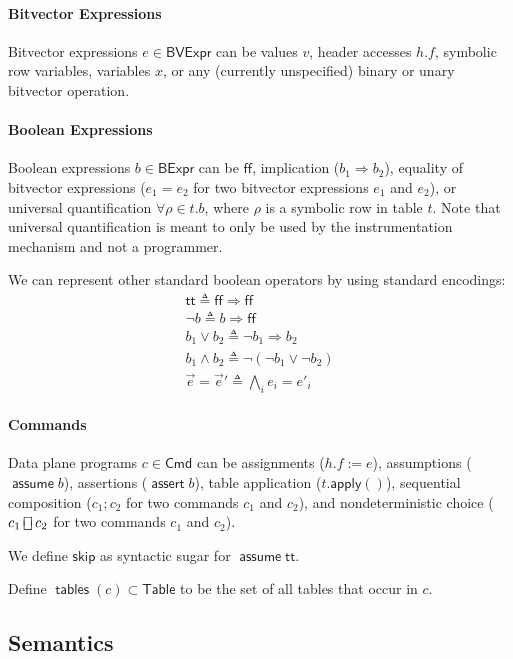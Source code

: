 \documentclass{article}
\newcommand{\TRUE}{\mathsf{tt}}
\newcommand{\FALSE}{\mathsf{ff}}
\newcommand{\BVExpr}{\mathsf{BVExpr}}
\newcommand{\BExpr}{\mathsf{BExpr}}
\newcommand{\Table}{\mathsf{Table}}
\newcommand{\assert}{\mathop{\mathsf{assert}}}
\newcommand{\assume}{\mathop{\mathsf{assume}}}
\newcommand{\apply}{\mathsf{apply}}
\newcommand{\choiceop}{\rotatebox[origin=c]{90}{$\sqsubset\!\!\!\sqsupset$}}
\newcommand{\choice}{\mathbin{\choiceop}}
\newcommand{\SKIP}{\mathsf{skip}}
\newcommand{\tables}{\mathop{\mathsf{tables}}}
\begin{document}
\paragraph{Bitvector Expressions}
Bitvector expressions $e \in \BVExpr$ can be values $v$, header accesses $h.f$,
symbolic row variables, variables $x$, or any
(currently unspecified) binary or unary bitvector operation.

\paragraph{Boolean Expressions}
Boolean expressions $b \in \BExpr$ can be $\FALSE$, implication ($b_1
\Rightarrow b_2$), equality of bitvector expressions ($e_1 = e_2$ for two
bitvector expressions $e_1$ and $e_2$), or universal quantification $\forall
\rho \in t. b$, where $\rho$ is a symbolic row in table $t$. Note that universal
quantification is meant to only be used by the instrumentation mechanism and not
a programmer.

We can represent other standard boolean operators by using standard encodings:
\[\begin{array}{l}
  \TRUE \triangleq \FALSE \Rightarrow \FALSE \\
  \neg b \triangleq b \Rightarrow \FALSE \\
  b_1 \vee b_2 \triangleq \neg b_1 \Rightarrow b_2 \\
  b_1 \wedge b_2 \triangleq \neg(\neg b_1 \vee \neg b_2) \\
  \vec e = \vec e' \triangleq \bigwedge_i e_i = e'_i
\end{array}\]

\paragraph{Commands}
Data plane programs $c \in \mathsf{Cmd}$ can be assignments ($h.f := e$),
assumptions ($\assume b$), assertions ($\assert b$), table application
($t.\apply()$), sequential composition ($c_1;c_2$ for two commands $c_1$ and $c_2$), and
nondeterministic choice ($c_1 \choice c_2$ for two commands $c_1$ and $c_2$).

We define $\SKIP$ as syntactic sugar for $\assume \TRUE$.

Define $\tables(c) \subset \Table$ to be the set of all tables that occur in $c$.

\subsection{Semantics}
\end{document}
